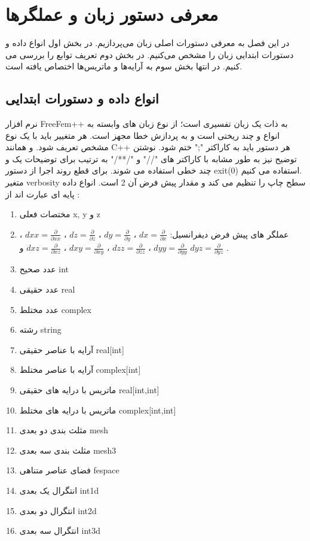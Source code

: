\chapter{معرفی دستور زبان و عملگرها}
در این فصل به معرفی دستورات اصلی زبان می‌پردازیم. در بخش اول انواع داده و دستورات ابتدایی زبان را مشخص می‌کنیم. در بخش دوم تعریف توابع را بررسی می کنیم. در انتها بخش سوم به آرایه‌ها و ماتریس‌ها اختصاص یافته است.
\section{انواع داده و دستورات ابتدایی}
نرم افزار FreeFem++ به ذات یک زبان تفسیری است؛ از نوع زبان های وابسته به انواع و چند ریختی است و به پردازش خطا مجهز است. هر متغییر باید با یک نوع مشخص تعریف شود. و همانند C++ هر دستور باید به کاراکتر ";" ختم شود. نوشتن توضیح نیز به طور مشابه با کاراکتر های "//" و "/**/" به ترتیب برای توضیحات یک و چند خطی استفاده می شوند. برای قطع روند اجرا از دستور exit(0) استفاده می کنیم.\\
متغیر verbosity سطح چاپ را تنظیم می کند و مقدار پیش فرض آن 2 است. انواع داده پایه ای عبارت اند از :
\begin{enumerate}
	\item مختصات فعلی x, y و z
	\item عملگر های پیش فرض دیفرانسیل:
		  $dx=\frac{\partial}{\partial x}$ ،
		  $dy=\frac{\partial}{\partial y}$ ،
		  $dz=\frac{\partial}{\partial z}$ ،
		  $dxx=\frac{\partial}{\partial xx}$ ،
		  $dyy=\frac{\partial}{\partial yy}$ ،
		  $dzz=\frac{\partial}{\partial zz}$ ،
		  $dxy=\frac{\partial}{\partial xy}$ ،
		  $dxz=\frac{\partial}{\partial xz}$ و
		  $dyz=\frac{\partial}{\partial yz}$ .
	\item عدد صحیح int
	\item عدد حقیقی real
	\item عدد مختلط complex
	\item رشته string
	\item آرایه با عناصر حقیقی real[int]
	\item آرایه با عناصر مختلط complex[int]
	\item ماتریس با درایه های حقیقی real[int,int]
	\item ماتریس با درایه های مختلط complex[int,int]
	\item مثلث بندی دو بعدی mesh
	\item مثلث بندی سه بعدی mesh3
	\item فضای عناصر متناهی fespace
	\item انتگرال یک بعدی int1d
	\item انتگرال دو بعدی int2d
	\item انتگرال سه بعدی int3d
\end{enumerate}
